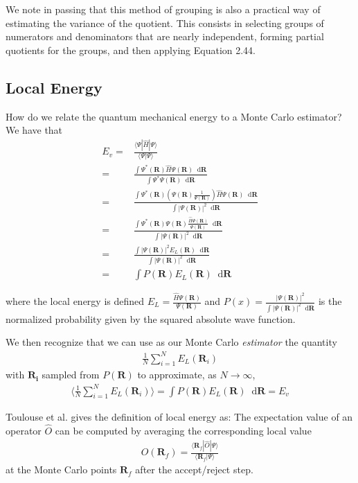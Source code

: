 \documentclass[twoside,english]{uiofysmaster}
\newcommand*\dif{\mathop{}\!\mathrm{d}}
\begin{document}
We note in passing that this method of grouping is also a practical way of estimating the variance of the quotient. This consists in selecting groups of numerators and denominators that are nearly independent, forming partial quotients for the groups, and then applying Equation 2.44. \cite{Kalos2008}

\subsection{Local Energy}
How do we relate the quantum mechanical energy to a Monte Carlo estimator? We have that \cite{Toulouse2016}
\begin{align}
	E_v =& \frac{\langle \Psi | \hat{H} | \Psi \rangle}{\langle \Psi | \Psi \rangle}  \\
	=& \frac{ \int \Psi^\ast (\bm{R}) \hat{H} \Psi(\bm{R}) \dif \bm{R} }
	{\int \Psi^\ast \Psi(\bm{R}) \dif \bm{R}} \\
	=& \frac{ \int \Psi^\ast (\bm{R}) (\Psi(\bm{R}) \frac{1}{\Psi(\bm{R})}) \hat{H} \Psi(\bm{R}) \dif \bm{R} }
	{\int | \Psi(\bm{R})|^2 \dif \bm{R}} \\
	=&  \frac{ \int \Psi^\ast (\bm{R}) \Psi(\bm{R}) \frac{\hat{H} \Psi(\bm{R}) }{\Psi(\bm{R})}  \dif \bm{R} }
	{\int | \Psi(\bm{R})|^2 \dif \bm{R}} \\
	=&  \frac{ \int | \Psi(\bm{R})|^2  E_L(\bm{R})  \dif \bm{R} }
	{\int | \Psi(\bm{R})|^2 \dif \bm{R}} \\
	=& \int P(\bm{R}) E_L (\bm{R}) \dif \bm{R}
\end{align}

where the local energy is defined $E_L = \frac{\hat{H} \Psi(\bm{R}) }{\Psi(\bm{R})} $ and $P(x) = \frac{| \Psi(\bm{R})|^2 }{ \int | \Psi(\bm{R})|^2 \dif \bm{R} }$ is the normalized probability given by the squared absolute wave function. 

We then recognize that we can use as our Monte Carlo \textit{estimator} the quantity
\begin{align}
	\frac{1}{N} \sum_{i=1}^N E_L(\bm{R}_i)
\end{align}
with $\bm{R_i}$ sampled from $P(\bm{R})$ to approximate, as $N \rightarrow \infty$, 
\begin{align}
	\langle \frac{1}{N} \sum_{i=1}^N E_L(\bm{R}_i) \rangle = \int P(\bm{R}) E_L(\bm{R}) \dif \bm{R} = E_v
\end{align}

Toulouse et al. \cite{Toulouse2016} gives the definition of local energy as: The expectation value of an operator $\hat{O}$ can be computed by averaging the corresponding local value
\begin{align}
	O(\bm{R}_f) = \frac{ \langle \bm{R}_f | \hat{O} |\Psi \rangle }{ \langle \bm{R}_f | \Psi \rangle }
\end{align}
at the Monte Carlo points $\bm{R}_f$ after the accept/reject step.
\end{document}
